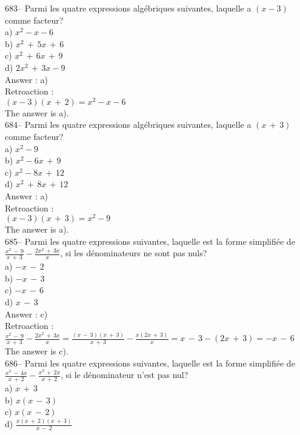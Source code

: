 ﻿\documentclass[letterpaper, 12pt]{article}
\begin{document}
683-- Parmi les quatre expressions alg\'ebriques suivantes, laquelle a
$\left( x-3\right)$ comme facteur?\\
a) $x^{2}-x-6$\\
b) $x^{2}\,+\,5x\,+\,6$\\
c) $x^{2}\,+\,6x\,+\,9$\\
d) $2x^{2}\,+\,3x-9$\\

Answer : a)\\

Retroaction : \\
$(x-3)(x\,+\,2)=x^{2}-x-6$\\
The answer is a).\\

684-- Parmi les quatre expressions alg\'ebriques suivantes, laquelle a
$\left( x\,+\,3\right) $ comme facteur?\\
a) $x^{2}-9$\\
b) $x^{2}-6x\,+\,9$\\
c) $x^{2}-8x\,+\,12$\\
d) $x^{2}\,+\,8x\,+\,12$\\

Answer : a)\\

Retroaction : \\
$\left( x-3\right) \left( x\,+\,3\right) = x^{2}-9$\\
The answer is a).\\

685-- Parmi les quatre expressions suivantes, laquelle est la forme
simplifi\'ee de $\frac{x^{2}\,-\,9}{x\,+\,3}-\frac{2x^{2}\,+\,3x}{x}$, si
les d\'enominateurs ne sont pas nuls?\\
a) $-x\,-\,2$\\
b) $-x\,-\,3$\\
c) $-x\,-\,6$\\
d) $x\,-\,3$\\

Answer : c)\\

Retroaction : \\[2mm]
$\frac{x^{2}\,-\,9}{x\,+\,3}-\frac{2x^{2}\,+\,3x}{x}=\frac{\left(
x\,-\,3\right) \left( x\,+\,3\right) }{x\,+\,3} -\frac{x\left(
2x\,+\,3\right) }{x}=x\,-\,3-\left( 2x\,+\,3\right) =-x\,-\,6$\\[2mm]
The answer is c).\\

686-- Parmi les quatre expressions suivantes, laquelle est la forme
simplifi\'ee de $\frac{x^{3}\,-\,4x}{x\,+\,2}-\frac{x^{2}\,+\,2x}{x\,+\,2}$,
si le d\'enominateur n'est pas nul?\\
a) $ x\,+\,3$\\[2mm]
b) $x\left( x\,-\,3\right) $\\[2mm]
c) $x\left( x\,-\,2\right) $\\[2mm]
d) $\frac{x\left( x\,+\,2\right) \left( x\,+\,3\right)}{x\,-\,2}$\\
\end{document}
